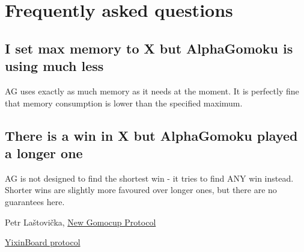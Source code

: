 \documentclass[12pt,a4paper]{article}
\begin{document}
\newpage
\section{Frequently asked questions}

\subsection{I set max memory to X but AlphaGomoku is using much less}
AG uses exactly as much memory as it needs at the moment. It is perfectly fine that memory consumption 
is lower than the specified maximum.


\subsection{There is a win in X but AlphaGomoku played a longer one}
AG is not designed to find the shortest win - it tries to find ANY win instead. Shorter wins are slightly more favoured over longer ones, but there are no guarantees here.

\newpage
\begin{thebibliography}{99}
Petr Laštovička, \href{http://petr.lastovicka.sweb.cz/protocl2en.htm}{New Gomocup Protocol}

\href{https://github.com/accreator/Yixin-protocol/blob/master/protocol.pdf}{YixinBoard protocol}

\end{thebibliography}
\end{document}
